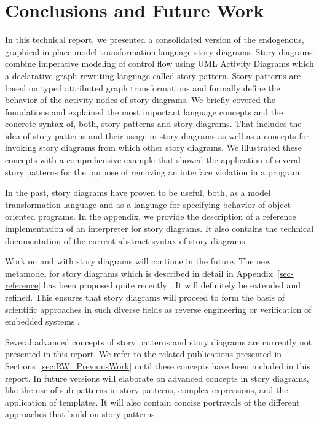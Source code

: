 \chapter{Conclusions and Future Work} \label{sec:Conclusion}


In this technical report, we presented a consolidated version of the endogenous, graphical in-place model transformation language story diagrams. 
Story diagrams combine imperative modeling of control flow using UML Activity Diagrams which a declarative graph rewriting language called story pattern. 
Story patterns are based on typed attributed graph transformations and  formally define the behavior of the activity nodes of story diagrams. 
We briefly covered the foundations and explained the most important language concepts and the concrete syntax of, both, story patterns and story diagrams. 
That includes the idea of story patterns and their usage in story diagrams as well as a concepts for invoking story diagrams from which other story diagrams. 
We illustrated these concepts with a comprehensive example that showed the application of several story patterns for the purpose of removing an interface violation in a program. 

In the past, story diagrams have proven to be useful, both, as a model transformation language and as a language for specifying behavior of object-oriented programs. 
In the appendix, we provide the description of a reference implementation of an interpreter for story diagrams. It also contains the technical documentation of the current abstract syntax of story diagrams.


Work on and with story diagrams will continue in the future. The new metamodel for story diagrams which is described in detail in Appendix~\ref{sec-reference} has been proposed quite recently \cite{HRvD+11}. It will definitely be extended and refined. This ensures that story diagrams will proceed to form the basis of scientific approaches in such diverse fields as reverse engineering \cite{DMT10} or verification of embedded systems \cite{HSE10}.

Several advanced concepts of story patterns and story diagrams are currently not presented in this report. We refer to the related publications presented in Sections~\ref{sec:RW_PreviousWork} until these concepts have been included in this report. In future versions will elaborate on advanced concepts in story diagrams, like the use of sub patterns in story patterns, complex expressions, and the application of templates. It will also contain concise portrayals of the different approaches that build on story patterns.

